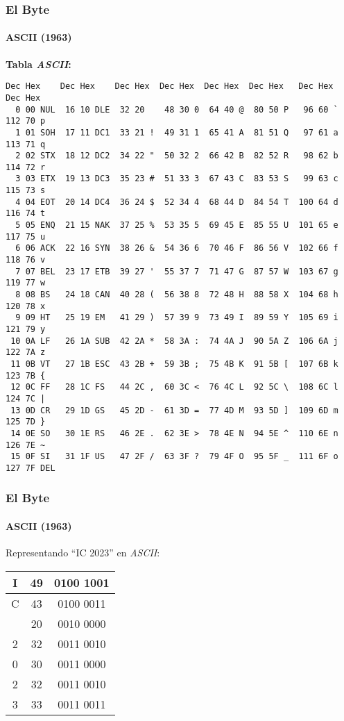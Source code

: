 \documentclass[11pt,a4paper,spanish]{beamer}
\begin{document}
\begin{frame}[fragile]

\frametitle{El Byte}
\framesubtitle{ASCII (1963)}
\textbf{Tabla \emph{ASCII}:}

\tiny
\begin{verbatim}
Dec Hex    Dec Hex    Dec Hex  Dec Hex  Dec Hex  Dec Hex   Dec Hex   Dec Hex
  0 00 NUL  16 10 DLE  32 20    48 30 0  64 40 @  80 50 P   96 60 `  112 70 p
  1 01 SOH  17 11 DC1  33 21 !  49 31 1  65 41 A  81 51 Q   97 61 a  113 71 q
  2 02 STX  18 12 DC2  34 22 "  50 32 2  66 42 B  82 52 R   98 62 b  114 72 r
  3 03 ETX  19 13 DC3  35 23 #  51 33 3  67 43 C  83 53 S   99 63 c  115 73 s
  4 04 EOT  20 14 DC4  36 24 $  52 34 4  68 44 D  84 54 T  100 64 d  116 74 t
  5 05 ENQ  21 15 NAK  37 25 %  53 35 5  69 45 E  85 55 U  101 65 e  117 75 u
  6 06 ACK  22 16 SYN  38 26 &  54 36 6  70 46 F  86 56 V  102 66 f  118 76 v
  7 07 BEL  23 17 ETB  39 27 '  55 37 7  71 47 G  87 57 W  103 67 g  119 77 w
  8 08 BS   24 18 CAN  40 28 (  56 38 8  72 48 H  88 58 X  104 68 h  120 78 x
  9 09 HT   25 19 EM   41 29 )  57 39 9  73 49 I  89 59 Y  105 69 i  121 79 y
 10 0A LF   26 1A SUB  42 2A *  58 3A :  74 4A J  90 5A Z  106 6A j  122 7A z
 11 0B VT   27 1B ESC  43 2B +  59 3B ;  75 4B K  91 5B [  107 6B k  123 7B {
 12 0C FF   28 1C FS   44 2C ,  60 3C <  76 4C L  92 5C \  108 6C l  124 7C |
 13 0D CR   29 1D GS   45 2D -  61 3D =  77 4D M  93 5D ]  109 6D m  125 7D }
 14 0E SO   30 1E RS   46 2E .  62 3E >  78 4E N  94 5E ^  110 6E n  126 7E ~
 15 0F SI   31 1F US   47 2F /  63 3F ?  79 4F O  95 5F _  111 6F o  127 7F DEL
\end{verbatim}

\end{frame}

\begin{frame}

\frametitle{El Byte}
\framesubtitle{ASCII (1963)}

    Representando ``IC 2023'' en \emph{ASCII}:

\centering
\begin{tabular}{c  c  c}
    I & 49 & 0100 1001\\ \hline
    C & 43 & 0100 0011\\ \hline
      & 20 & 0010 0000\\ \hline
    2 & 32 & 0011 0010\\ \hline
    0 & 30 & 0011 0000\\ \hline
    2 & 32 & 0011 0010\\ \hline
    3 & 33 & 0011 0011\\
\end{tabular}

\end{frame}
\end{document}
